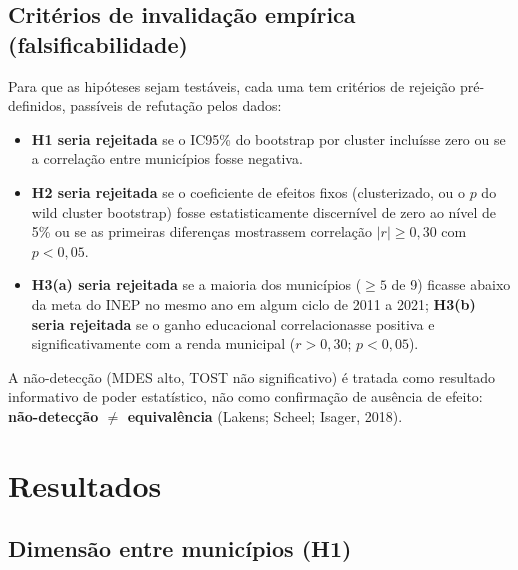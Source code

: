 \documentclass[12pt,a4paper]{article}
\begin{document}
\subsection{Critérios de invalidação empírica (falsificabilidade)}

Para que as hipóteses sejam testáveis, cada uma tem critérios de rejeição pré-definidos, passíveis de refutação pelos dados:

\begin{itemize}
\item \textbf{H1 seria rejeitada} se o IC95\% do bootstrap por cluster incluísse zero ou se a correlação entre municípios fosse negativa.
\item \textbf{H2 seria rejeitada} se o coeficiente de efeitos fixos (clusterizado, ou o $p$ do wild cluster bootstrap) fosse estatisticamente discernível de zero ao nível de 5\% ou se as primeiras diferenças mostrassem correlação $|r| \geq 0{,}30$ com $p < 0{,}05$.
\item \textbf{H3(a) seria rejeitada} se a maioria dos municípios ($\geq 5$ de 9) ficasse abaixo da meta do INEP no mesmo ano em algum ciclo de 2011 a 2021; \textbf{H3(b) seria rejeitada} se o ganho educacional correlacionasse positiva e significativamente com a renda municipal ($r > 0{,}30$; $p < 0{,}05$).
\end{itemize}

A não-detecção (MDES alto, TOST não significativo) é tratada como resultado informativo de poder estatístico, não como confirmação de ausência de efeito: \textbf{não-detecção $\neq$ equivalência} (Lakens; Scheel; Isager, 2018).

\section{Resultados}

\subsection{Dimensão entre municípios (H1)}
\end{document}
